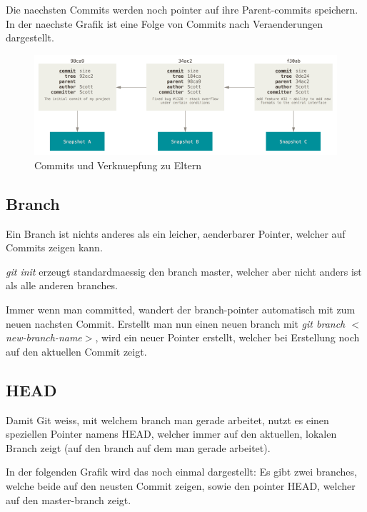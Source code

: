 \documentclass{article}
\begin{document}
Die naechsten Commits werden noch pointer auf ihre Parent-commits speichern.
In der naechste Grafik ist eine Folge von Commits nach Veraenderungen dargestellt.

\begin{figure}[h!]
    \centering
    \includegraphics[width=\textwidth]{../bilder/branch2.png}
    \caption{Commits und Verknuepfung zu Eltern}
    \label{branch2}
\end{figure} 

\subsection*{Branch}
Ein Branch ist nichts anderes als ein leicher, aenderbarer Pointer, welcher auf Commits zeigen kann.

\textit{git init} erzeugt standardmaessig den branch master, welcher aber nicht anders ist als alle anderen branches.

Immer wenn man committed, wandert der branch-pointer automatisch mit zum neuen nachsten Commit.
Erstellt man nun einen neuen branch mit \textit{git branch $<$new-branch-name$>$}, wird ein neuer Pointer erstellt, welcher bei Erstellung noch auf den aktuellen Commit zeigt.

\subsection*{HEAD}
Damit Git weiss, mit welchem branch man gerade arbeitet, nutzt es einen speziellen Pointer namens HEAD, welcher immer auf den aktuellen, lokalen Branch zeigt (auf den branch auf dem man gerade arbeitet).


In der folgenden Grafik wird das noch einmal dargestellt: Es gibt zwei branches, welche beide auf den neusten Commit zeigen, sowie den pointer HEAD, welcher auf den master-branch zeigt.
\end{document}
